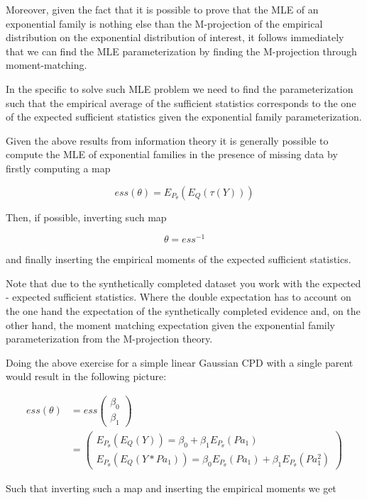 \documentclass[11pt]{article}
\begin{document}
\begin{article}
Moreover, given the fact that it is possible to prove that the MLE
of an exponential family is nothing else than the M-projection of
the empirical distribution on the exponential distribution of
interest, it follows immediately that we can find the MLE
parameterization by finding the M-projection through
moment-matching.

In the specific to solve such MLE problem we need to find the
parameterization such that the empirical average of the sufficient
statistics corresponds to the one of the expected sufficient
statistics given the exponential family parameterization.

Given the above results from information theory it is generally
possible to compute the MLE of exponential families in the presence
of missing data by firstly computing a map

$$ess(\theta) = E_{P_\theta}(E_Q(\tau(Y)))$$

Then, if possible, inverting such map

$$\theta = ess^{-1}$$

and finally inserting the empirical moments of the expected
sufficient statistics.

Note that due to the synthetically completed dataset you work with
the expected - expected sufficient statistics. Where the double
expectation has to account on the one hand the expectation of the
synthetically completed evidence and, on the other hand, the moment
matching expectation given the exponential family parameterization
from the M-projection theory.

Doing the above exercise for a simple linear Gaussian CPD with a
single parent would result in the following picture:

 \begin{align*}
 ess (\theta) &= ess\begin{pmatrix}
                 \beta_0\\
		 \beta_1
		 \end{pmatrix} \\
		 &= \begin{pmatrix}
		 E_{P_\theta}(E_Q(Y)) = \beta_0 + \beta_1 E_{P_\theta}(Pa_1) \\
		 E_{P_\theta}(E_Q(Y * Pa_1)) = \beta_0 E_{P_\theta}(Pa_1) + \beta_1 E_{P_\theta}(Pa_1^2)
		 \end{pmatrix}
\end{align*}


Such that inverting such a map and inserting the empirical moments
we get


\end{article}
\end{document}
